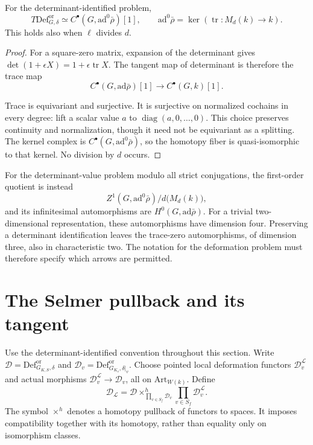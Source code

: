 \begin{proposition}\label{v4-arith:coefficients:prop:determinant}
For the determinant-identified problem,
\[
 T\mathrm{Def}_{G,\delta}^{\mathrm{or}}
 \simeq C^\bullet(G,\mathrm{ad}^0\bar\rho)[1],
 \qquad
 \mathrm{ad}^0\bar\rho=\ker(\operatorname{tr}:M_d(k)\to k).
\]
This holds also when \(\ell\) divides \(d\).
\end{proposition}
\begin{proof}
For a square-zero matrix, expansion of the determinant gives
\(\det(1+\epsilon X)=1+\epsilon\operatorname{tr}X\).
The tangent map of determinant is therefore the trace map
\[
 C^\bullet(G,\mathrm{ad}\bar\rho)[1]
 \longrightarrow C^\bullet(G,k)[1].
\]

Trace is equivariant and surjective. It is surjective on normalized
cochains in every degree: lift a scalar value \(a\) to
\(\operatorname{diag}(a,0,\ldots,0)\). This choice preserves
continuity and normalization, though it need not be equivariant as
a splitting. The kernel complex is
\(C^\bullet(G,\mathrm{ad}^0\bar\rho)\), so the homotopy fiber is
quasi-isomorphic to that kernel. No division by \(d\) occurs.
\end{proof}

For the determinant-value problem modulo all strict conjugations,
the first-order quotient is instead
\[
 Z^1(G,\mathrm{ad}^0\bar\rho)\big/d\bigl(M_d(k)\bigr),
\]
and its infinitesimal automorphisms are \(H^0(G,\mathrm{ad}\bar\rho)\).
For a trivial two-dimensional representation, these automorphisms
have dimension four. Preserving a determinant identification leaves
the trace-zero automorphisms, of dimension three, also in
characteristic two. The notation for the deformation problem must
therefore specify which arrows are permitted.

\section{The Selmer pullback and its tangent}
\label{v4-arith:coefficients:sec:selmer-functor}

Use the determinant-identified convention throughout this section.
Write \(\mathcal D=\mathrm{Def}_{G_{K,S},\delta}^{\mathrm{or}}\)
and \(\mathcal D_v=\mathrm{Def}_{G_{K_v},\delta|_v}^{\mathrm{or}}\).
Choose pointed local deformation functors \(\mathcal D_v^{\mathcal L}\)
and actual morphisms \(\mathcal D_v^{\mathcal L}\to\mathcal D_v\),
all on \(\mathrm{Art}_{W(k)}\). Define
\begin{equation}\label{v4-arith:coefficients:eq:selmer-functor}
 \mathcal D_{\mathcal L}
 =\mathcal D\times^h_{\prod_{v\in S_f}\mathcal D_v}
                    \prod_{v\in S_f}\mathcal D_v^{\mathcal L}.
\end{equation}
The symbol \(\times^h\) denotes a homotopy pullback of functors to
spaces. It imposes compatibility together with its homotopy, rather
than equality only on isomorphism classes.

